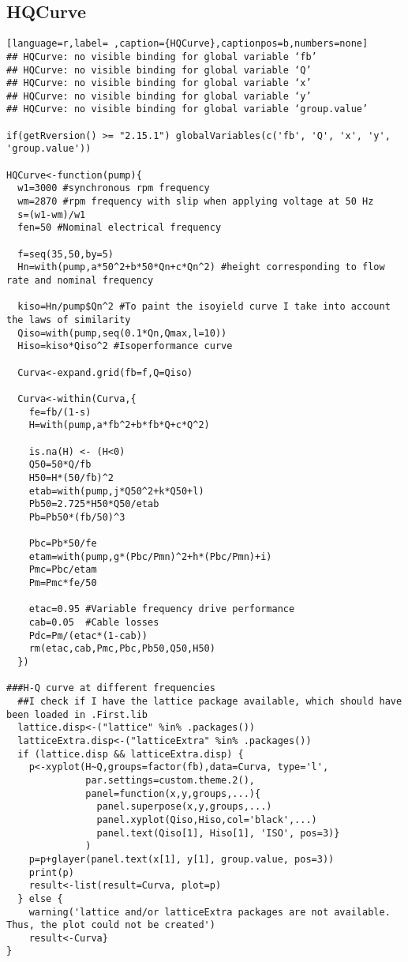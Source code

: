 \subsection{HQCurve}
\label{sec:org55e600a}
\label{subsec:hqcurve}
\begin{lstlisting}[language=r,label= ,caption={HQCurve},captionpos=b,numbers=none]
## HQCurve: no visible binding for global variable ‘fb’
## HQCurve: no visible binding for global variable ‘Q’
## HQCurve: no visible binding for global variable ‘x’
## HQCurve: no visible binding for global variable ‘y’
## HQCurve: no visible binding for global variable ‘group.value’

if(getRversion() >= "2.15.1") globalVariables(c('fb', 'Q', 'x', 'y', 'group.value'))

HQCurve<-function(pump){
  w1=3000 #synchronous rpm frequency
  wm=2870 #rpm frequency with slip when applying voltage at 50 Hz
  s=(w1-wm)/w1
  fen=50 #Nominal electrical frequency

  f=seq(35,50,by=5)
  Hn=with(pump,a*50^2+b*50*Qn+c*Qn^2) #height corresponding to flow rate and nominal frequency

  kiso=Hn/pump$Qn^2 #To paint the isoyield curve I take into account the laws of similarity
  Qiso=with(pump,seq(0.1*Qn,Qmax,l=10))
  Hiso=kiso*Qiso^2 #Isoperformance curve

  Curva<-expand.grid(fb=f,Q=Qiso)

  Curva<-within(Curva,{
    fe=fb/(1-s)
    H=with(pump,a*fb^2+b*fb*Q+c*Q^2)

    is.na(H) <- (H<0)
    Q50=50*Q/fb
    H50=H*(50/fb)^2
    etab=with(pump,j*Q50^2+k*Q50+l)
    Pb50=2.725*H50*Q50/etab
    Pb=Pb50*(fb/50)^3

    Pbc=Pb*50/fe
    etam=with(pump,g*(Pbc/Pmn)^2+h*(Pbc/Pmn)+i)
    Pmc=Pbc/etam
    Pm=Pmc*fe/50

    etac=0.95 #Variable frequency drive performance
    cab=0.05  #Cable losses
    Pdc=Pm/(etac*(1-cab))
    rm(etac,cab,Pmc,Pbc,Pb50,Q50,H50)
  })

###H-Q curve at different frequencies
  ##I check if I have the lattice package available, which should have been loaded in .First.lib
  lattice.disp<-("lattice" %in% .packages())
  latticeExtra.disp<-("latticeExtra" %in% .packages())
  if (lattice.disp && latticeExtra.disp) {
    p<-xyplot(H~Q,groups=factor(fb),data=Curva, type='l',
              par.settings=custom.theme.2(),
              panel=function(x,y,groups,...){
                panel.superpose(x,y,groups,...)
                panel.xyplot(Qiso,Hiso,col='black',...)
                panel.text(Qiso[1], Hiso[1], 'ISO', pos=3)}
              )
    p=p+glayer(panel.text(x[1], y[1], group.value, pos=3))
    print(p)
    result<-list(result=Curva, plot=p)
  } else {
    warning('lattice and/or latticeExtra packages are not available. Thus, the plot could not be created')
    result<-Curva}
}
\end{lstlisting}
